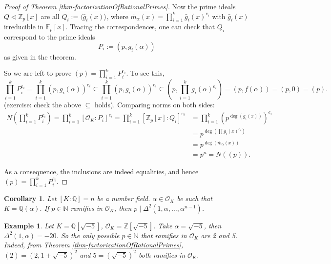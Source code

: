 \documentclass[11pt]{book}
\newtheorem{corollary}[theorem]{Corollary}
\newtheorem{example}[theorem]{Example}
\begin{document}
\begin{proof}[Proof of Theorem \ref{thm-factorizationOfRationalPrimes}]
Now the prime ideals $ Q  \lhd \mathbb{Z}_p[x]$ are all $Q_i := \langle \bar{g}_i(x) \rangle$, where $ \overline{m}_{\alpha}(x) = \prod_{i=1}^k \bar{g}_i(x)^{e_i}$ with $\bar{g}_i(x)$ irreducible in $\mathbb{F}_p[x]$. Tracing the correspondences, one can check that $Q_i$ correspond to the prime ideals 
$$P_i := (p, g_i(\alpha))$$ 
as given in the theorem.

So we are left to prove $(p) = \prod_{i=1}^k P_i^{e_i}$. To see this,
$$
\prod_{i=1}^k P_i^{e_i} = \prod_{i=1}^k (p, g_i(\alpha))^{e_i} \subseteq \prod_{i=1}^k (p, g_i(\alpha))^{e_i} \subseteq \left(p, \prod_{i=1}^k g_i(\alpha)^{e_i}\right) = (p, f(\alpha)) = (p, 0) = (p).
$$
(exercise: check the above $\subseteq$ holds). Comparing norms on both sides:
\begin{align*}
N\left(\prod_{i=1}^k P_i^{e_i}\right) = \prod_{i=1}^k [\mathcal{O}_K: P_i]^{e_i} 
= \prod_{i=1}^k [\mathbb{Z}_p[x]: Q_i]^{e_i} &= \prod_{i=1}^k (p^{\deg(\bar{g}_i(x))})^{e_i}\\ &= p^{\deg(\prod \bar{g}_i(x)^{e_i})}\\ &= p^{\deg(\bar{m}_{\alpha}(x))}\\ &= p^n = N((p)).    
\end{align*}

As a consequence, the inclusions are indeed equalities, and hence $(p) = \prod_{i=1}^k P_i^{e_i}$.
\end{proof}

\begin{corollary}\label{cor-ramifiedPrimeNorm}
    Let $[K:\mathbb{Q}]=n$ be a number field. $\alpha\in \mathcal{O}_{K}$ be such that $K=\mathbb{Q}(\alpha)$. If $p\in\mathbb{N}$ ramifies in $\mathcal{O}_{K}$, then $p\mid \Delta^{2}(1,\alpha,\dots,\alpha^{n-1})$. 
\end{corollary}

\begin{example}
    Let $K=\mathbb{Q}[\sqrt{-5}]$, $\mathcal{O}_{K}=\mathbb{Z}[\sqrt{-5}]$. Take $\alpha=\sqrt{-5}$, then $\Delta^{2}(1,\alpha)=-20$. So the only possible $p\in \mathbb{N}$ that ramifies in $\mathcal{O}_{K}$ are 2 and 5. Indeed, from Theorem \ref{thm-factorizationOfRationalPrimes}, $(2)=(2,1+\sqrt{-5})^{2}$ and $5=(\sqrt{-5})^{2}$ both ramifies in $\mathcal{O}_K$. 
\end{example}
\end{document}
